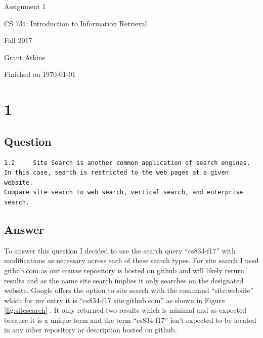 \documentclass[letterpaper,11pt]{article}
\begin{document}
\begin{titlepage}

\begin{center}

\Huge{Assignment 1}

\Large{CS 734:  Introduction to Information Retrieval}

\Large{Fall 2017}

\Large{Grant Atkins}

\Large Finished on \today

\end{center}

\end{titlepage}

\newpage


\section*{1}

\subsection*{Question}

\begin{verbatim}
1.2 	Site Search is another common application of search engines. 
In this case, search is restricted to the web pages at a given website. 
Compare site search to web search, vertical search, and enterprise search.
\end{verbatim}

\subsection*{Answer}

To answer this question I decided to use the search query ``cs834-f17'' with modifications as necessary across each of these search types. 
For site search I used github.com as our course repository is hosted on github and will likely return results and as the name site search implies it only searches on the designated website.
Google offers the option to site search with the command ``site:website'' which for my entry it is ``cs834-f17 site:github.com''  as shown in Figure \ref{fig:sitesearch} \cite{googlesite}.
It only returned two results which is minimal and as expected because it is a unique term and the term ``cs834-f17'' isn't expected to be located in any other repository or description hosted on github.
\end{document}

